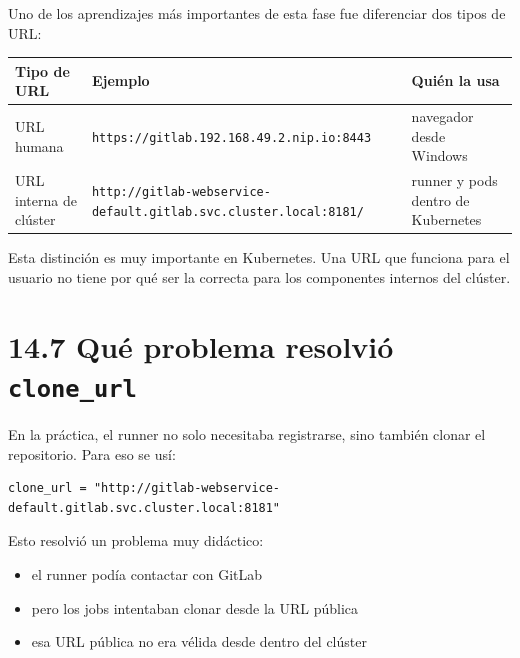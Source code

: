 \documentclass[
a4paper,
12pt]{report}
\providecommand{\tightlist}{%
  \setlength{\itemsep}{0pt}\setlength{\parskip}{0pt}}
\begin{document}
Uno de los aprendizajes más importantes de esta fase fue diferenciar dos
tipos de URL:

{\def\LTcaptype{table} %
\begin{longtable}[]{@{}
  >{\raggedright\arraybackslash}p{}
  >{\raggedright\arraybackslash}p{}
  >{\raggedright\arraybackslash}p{}@{}}
\toprule\noalign{}
\begin{minipage}[b]{\linewidth}\raggedright
Tipo de URL
\end{minipage} & \begin{minipage}[b]{\linewidth}\raggedright
Ejemplo
\end{minipage} & \begin{minipage}[b]{\linewidth}\raggedright
Quién la usa
\end{minipage} \\
\midrule\noalign{}
\endhead
\bottomrule\noalign{}
\endlastfoot
URL humana & \texttt{https://gitlab.192.168.49.2.nip.io:8443} &
navegador desde Windows \\
URL interna de clúster &
\texttt{http://gitlab-webservice-default.gitlab.svc.cluster.local:8181/}
& runner y pods dentro de Kubernetes \\
\end{longtable}
}

Esta distinción es muy importante en Kubernetes. Una URL que funciona
para el usuario no tiene por qué ser la correcta para los componentes
internos del clúster.

\section{\texorpdfstring{14.7 Qué problema resolvió
\texttt{clone\_url}}{14.7 Qué problema resolvió clone\_url}}\label{quuxe9-problema-resolviuxf3-clone_url}

En la práctica, el runner no solo necesitaba registrarse, sino también
clonar el repositorio. Para eso se usí:

\begin{verbatim}
clone_url = "http://gitlab-webservice-default.gitlab.svc.cluster.local:8181"
\end{verbatim}

Esto resolvió un problema muy didáctico:

\begin{itemize}
\tightlist
\item
  el runner podía contactar con GitLab
\item
  pero los jobs intentaban clonar desde la URL pública
\item
  esa URL pública no era vélida desde dentro del clúster
\end{itemize}
\end{document}
